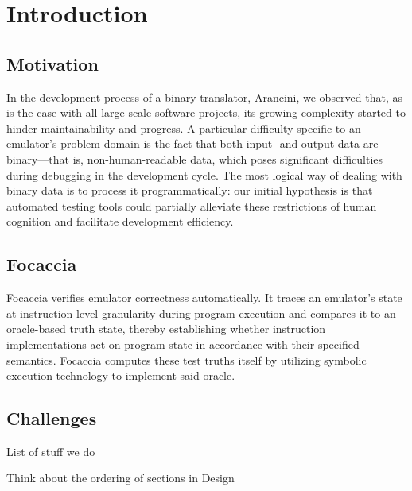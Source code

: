 
\chapter{Introduction}\label{chapter:introduction}

\section{Motivation}

In the development process of a binary translator, Arancini, we observed that, as is the case with all large-scale
software projects, its growing complexity started to hinder maintainability and progress. A particular difficulty
specific to an emulator's problem domain is the fact that both input- and output data are binary---that is,
non-human-readable data, which poses significant difficulties during debugging in the development cycle. The most
logical way of dealing with binary data is to process it programmatically: our initial hypothesis is that automated
testing tools could partially alleviate these restrictions of human cognition and facilitate development efficiency.

\section{Focaccia}\label{sec:intro:focaccia}

Focaccia verifies emulator correctness automatically. It traces an emulator's state at instruction-level granularity
during program execution and compares it to an oracle-based truth state, thereby establishing whether instruction
implementations act on program state in accordance with their specified semantics. Focaccia computes these test truths
itself by utilizing symbolic execution technology to implement said oracle.

\section{Challenges}\label{sec:intro:challenges}

List of stuff we do


Think about the ordering of sections in Design
